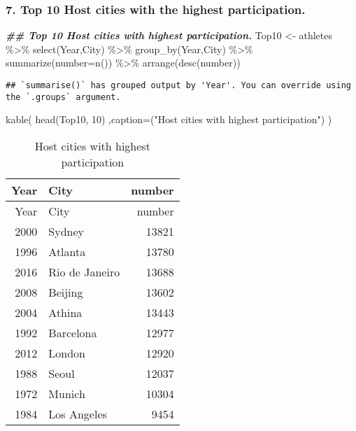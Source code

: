 \documentclass[
]{article}
\newenvironment{Shaded}{\begin{snugshade}}{\end{snugshade}}
\newcommand{\AttributeTok}[1]{\textcolor[rgb]{0.77,0.63,0.00}{#1}}
\newcommand{\DecValTok}[1]{\textcolor[rgb]{0.00,0.00,0.81}{#1}}
\newcommand{\DocumentationTok}[1]{\textcolor[rgb]{0.56,0.35,0.01}{\textbf{\textit{#1}}}}
\newcommand{\FunctionTok}[1]{\textcolor[rgb]{0.00,0.00,0.00}{#1}}
\newcommand{\NormalTok}[1]{#1}
\newcommand{\OtherTok}[1]{\textcolor[rgb]{0.56,0.35,0.01}{#1}}
\newcommand{\SpecialCharTok}[1]{\textcolor[rgb]{0.00,0.00,0.00}{#1}}
\newcommand{\StringTok}[1]{\textcolor[rgb]{0.31,0.60,0.02}{#1}}
\begin{document}
\hypertarget{top-10-host-cities-with-the-highest-participation.}{%
\subsubsection{7. Top 10 Host cities with the highest
participation.}\label{top-10-host-cities-with-the-highest-participation.}}

\begin{Shaded}
\begin{Highlighting}[]
\DocumentationTok{\#\# Top 10 Host cities with highest participation.}
\NormalTok{Top10 }\OtherTok{\textless{}{-}}
\NormalTok{  athletes }\SpecialCharTok{\%\textgreater{}\%}
    \FunctionTok{select}\NormalTok{(Year,City) }\SpecialCharTok{\%\textgreater{}\%}
    \FunctionTok{group\_by}\NormalTok{(Year,City) }\SpecialCharTok{\%\textgreater{}\%}
    \FunctionTok{summarize}\NormalTok{(}\AttributeTok{number=}\FunctionTok{n}\NormalTok{()) }\SpecialCharTok{\%\textgreater{}\%}
    \FunctionTok{arrange}\NormalTok{(}\FunctionTok{desc}\NormalTok{(number))}
\end{Highlighting}
\end{Shaded}

\begin{verbatim}
## `summarise()` has grouped output by 'Year'. You can override using the `.groups` argument.
\end{verbatim}

\begin{Shaded}
\begin{Highlighting}[]
\FunctionTok{kable}\NormalTok{(}
  \FunctionTok{head}\NormalTok{(Top10, }\DecValTok{10}\NormalTok{)}
\NormalTok{  ,}\AttributeTok{caption=}\NormalTok{(}\StringTok{"Host cities with highest participation"}\NormalTok{)}
\NormalTok{)}
\end{Highlighting}
\end{Shaded}

\begin{longtable}[]{@{}rlr@{}}
\caption{Host cities with highest participation}\tabularnewline
\toprule
Year & City & number \\
\midrule
\endfirsthead
\toprule
Year & City & number \\
\midrule
\endhead
2000 & Sydney & 13821 \\
1996 & Atlanta & 13780 \\
2016 & Rio de Janeiro & 13688 \\
2008 & Beijing & 13602 \\
2004 & Athina & 13443 \\
1992 & Barcelona & 12977 \\
2012 & London & 12920 \\
1988 & Seoul & 12037 \\
1972 & Munich & 10304 \\
1984 & Los Angeles & 9454 \\
\bottomrule
\end{longtable}
\end{document}
